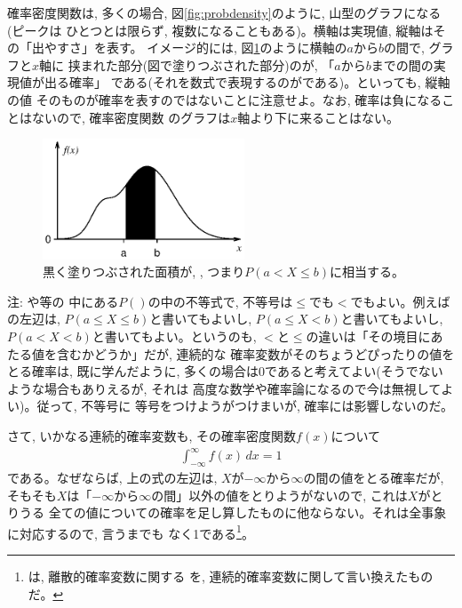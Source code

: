 確率密度関数は, 多くの場合, 図\ref{fig:probdensity}のように, 山型のグラフになる(ピークは
ひとつとは限らず, 複数になることもある)。横軸は実現値, 縦軸はその「出やすさ」を表す。
イメージ的には, 図\ref{fig:probdensity_a_b}のように横軸の$a$から$b$の間で, グラフと$x$軸に
挟まれた部分(図で塗りつぶされた部分)のが, 「$a$から$b$までの間の実現値が出る確率」
である(それを数式で表現するのがである)。といっても, 縦軸の値
そのものが確率を表すのではないことに注意せよ。なお, 確率は負になることはないので, 確率密度関数
のグラフは$x$軸より下に来ることはない。\\

\begin{figure}[h]
    \centering
    \includegraphics[width=6cm]{probdensity_a_b.eps}
    \caption{黒く塗りつぶされた面積が, , つまり$P(a < X \le b)$に相当する。}\label{fig:probdensity_a_b}
\end{figure}

{\small 注: や等の
中にある$P()$の中の不等式で, 不等号は$\leq$でも$<$でもよい。例えば
の左辺は, $P(a \le X \le b)$と書いてもよいし, 
$P(a \le X < b)$と書いてもよいし, $P(a < X < b)$と書いてもよい。というのも, 
$<$と$\le$の違いは「その境目にあたる値を含むかどうか」だが, 連続的な
確率変数がそのちょうどぴったりの値をとる確率は, 既に学んだように, 
多くの場合は0であると考えてよい(そうでないような場合もありえるが, それは
高度な数学や確率論になるので今は無視してよい)。従って, 不等号に
等号をつけようがつけまいが, 確率には影響しないのだ。}

さて, いかなる連続的確率変数も, その確率密度関数$f(x)$について
\begin{eqnarray}
\int_{-\infty}^{\infty}f(x)\,dx=1\label{eq:probinteq1}
\end{eqnarray}
である。なぜならば, 上の式の左辺は, $X$が$-\infty$から$\infty$の間の値をとる確率だが, 
そもそも$X$は「$-\infty$から$\infty$の間」以外の値をとりようがないので, これは$X$がとりうる
全ての値についての確率を足し算したものに他ならない。それは全事象に対応するので, 言うまでも
なく1である\footnote{は, 離散的確率変数に関する
を, 連続的確率変数に関して言い換えたものだ。}。


